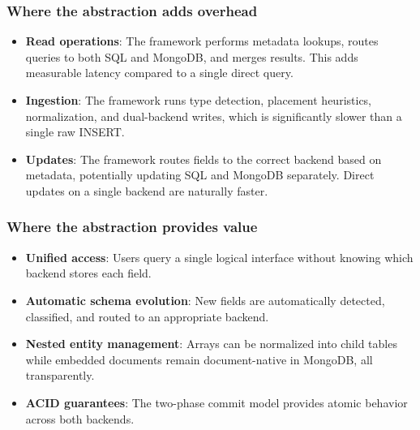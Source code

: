 \documentclass[12pt,a4paper]{article}
\begin{document}
\subsubsection*{Where the abstraction adds overhead}
\begin{itemize}
	\item \textbf{Read operations}: The framework performs metadata lookups, routes queries to both SQL and MongoDB, and merges results. This adds measurable latency compared to a single direct query.
	\item \textbf{Ingestion}: The framework runs type detection, placement heuristics, normalization, and dual-backend writes, which is significantly slower than a single raw INSERT.
	\item \textbf{Updates}: The framework routes fields to the correct backend based on metadata, potentially updating SQL and MongoDB separately. Direct updates on a single backend are naturally faster.
\end{itemize}

\subsubsection*{Where the abstraction provides value}
\begin{itemize}
	\item \textbf{Unified access}: Users query a single logical interface without knowing which backend stores each field.
	\item \textbf{Automatic schema evolution}: New fields are automatically detected, classified, and routed to an appropriate backend.
	\item \textbf{Nested entity management}: Arrays can be normalized into child tables while embedded documents remain document-native in MongoDB, all transparently.
	\item \textbf{ACID guarantees}: The two-phase commit model provides atomic behavior across both backends.
\end{itemize}
\end{document}
